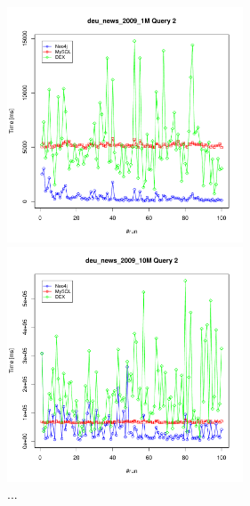 \documentclass[11pt, a4paper, oneside]{article} %
\begin{document}
\begin{appendix}
\begin{figure}[ht]
\begin{minipage}[hbt]{7cm}
	\centering
	\includegraphics[width=7cm]{../results/cold caches/images/1M_query2_perf}
	\caption{...}
	\label{fig:1M_query2_perf}
\end{minipage}
\hfill
\begin{minipage}[hbt]{7cm}
	\centering
	\includegraphics[width=7cm]{../results/cold caches/images/10M_query2_perf}
	\caption{...}
	\label{fig:10M_query2_perf}
\end{minipage}


\end{figure}
\end{appendix}
\end{document}
